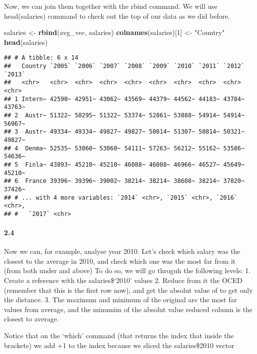 \documentclass[]{article}
\newenvironment{Shaded}{\begin{snugshade}}{\end{snugshade}}
\newcommand{\KeywordTok}[1]{\textcolor[rgb]{0.13,0.29,0.53}{\textbf{#1}}}
\newcommand{\DataTypeTok}[1]{\textcolor[rgb]{0.13,0.29,0.53}{#1}}
\newcommand{\DecValTok}[1]{\textcolor[rgb]{0.00,0.00,0.81}{#1}}
\newcommand{\StringTok}[1]{\textcolor[rgb]{0.31,0.60,0.02}{#1}}
\newcommand{\OperatorTok}[1]{\textcolor[rgb]{0.81,0.36,0.00}{\textbf{#1}}}
\newcommand{\NormalTok}[1]{#1}
\let\oldparagraph\paragraph
\renewcommand{\paragraph}[1]{\oldparagraph{#1}\mbox{}}
\begin{document}
Now, we can join them together with the rbind command. We will use
head(salaries) command to check out the top of our data as we did
before.

\begin{Shaded}
\begin{Highlighting}[]
\NormalTok{salaries <-}\StringTok{ }\KeywordTok{rbind}\NormalTok{(avg_vec, salaries)}
\KeywordTok{colnames}\NormalTok{(salaries)[}\DecValTok{1}\NormalTok{] <-}\StringTok{ "Country"}
\KeywordTok{head}\NormalTok{(salaries)}
\end{Highlighting}
\end{Shaded}

\begin{verbatim}
## # A tibble: 6 x 14
##   Country `2005` `2006` `2007` `2008` `2009` `2010` `2011` `2012` `2013`
##   <chr>   <chr>  <chr>  <chr>  <chr>  <chr>  <chr>  <chr>  <chr>  <chr> 
## 1 Intern~ 42590~ 42951~ 43062~ 43569~ 44379~ 44562~ 44183~ 43784~ 43763~
## 2  Austr~ 51322~ 50295~ 51322~ 53374~ 52861~ 53888~ 54914~ 54914~ 56967~
## 3  Austr~ 49334~ 49334~ 49827~ 49827~ 50814~ 51307~ 50814~ 50321~ 49827~
## 4  Denma~ 52535~ 53060~ 53060~ 54111~ 57263~ 56212~ 55162~ 53586~ 54636~
## 5  Finla~ 43893~ 45210~ 45210~ 46088~ 46088~ 46966~ 46527~ 45649~ 45210~
## 6  France 39396~ 39396~ 39002~ 38214~ 38214~ 38608~ 38214~ 37820~ 37426~
## # ... with 4 more variables: `2014` <chr>, `2015` <chr>, `2016` <chr>,
## #   `2017` <chr>
\end{verbatim}

\paragraph{2.4}\label{section-7}

Now we can, for example, analyse year 2010. Let's check which salary was
the closest to the average in 2010, and check which one was the most far
from it (from both under and above) To do so, we will go throguh the
following levels: 1. Create a reference with the salaries\$`2010' values
2. Reduce from it the OCED (remember that this is the first row now),
and get the absolut value of to get only the distance. 3. The maximum
and minimum of the original are the most far values from average, and
the minumim of the absolut value reduced column is the closest to
average.

Notice that on the `which' command (that returns the index that inside
the brackets) we add +1 to the index because we sliced the
salaries\$2010 vector

\begin{Shaded}
\end{Shaded}
\end{document}
